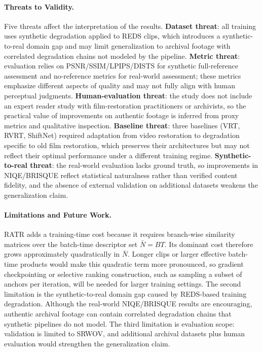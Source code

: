 \documentclass[symmetry,article,submit,pdftex,moreauthors]{Definitions/mdpi}
\begin{document}
\paragraph{Threats to Validity.}
Five threats affect the interpretation of the results. \textbf{Dataset threat}: all training uses synthetic degradation applied to REDS clips, which introduces a synthetic-to-real domain gap and may limit generalization to archival footage with correlated degradation chains not modeled by the pipeline. \textbf{Metric threat}: evaluation relies on PSNR/SSIM/LPIPS/DISTS for synthetic full-reference assessment and no-reference metrics for real-world assessment; these metrics emphasize different aspects of quality and may not fully align with human perceptual judgments. \textbf{Human-evaluation threat}: the study does not include an expert reader study with film-restoration practitioners or archivists, so the practical value of improvements on authentic footage is inferred from proxy metrics and qualitative inspection. \textbf{Baseline threat}: three baselines (VRT, RVRT, ShiftNet) required adaptation from video restoration to degradation specific to old film restoration, which preserves their architectures but may not reflect their optimal performance under a different training regime. \textbf{Synthetic-to-real threat}: the real-world evaluation lacks ground truth, so improvements in NIQE/BRISQUE reflect statistical naturalness rather than verified content fidelity, and the absence of external validation on additional datasets weakens the generalization claim.

\paragraph{Limitations and Future Work.}
RATR adds a training-time cost because it requires branch-wise similarity matrices over the batch-time descriptor set $\bar{N}=BT$. Its dominant cost therefore grows approximately quadratically in $\bar{N}$. Longer clips or larger effective batch-time products would make this quadratic term more pronounced, so gradient checkpointing or selective ranking construction, such as sampling a subset of anchors per iteration, will be needed for larger training settings. The second limitation is the synthetic-to-real domain gap caused by REDS-based training degradation. Although the real-world NIQE/BRISQUE results are encouraging, authentic archival footage can contain correlated degradation chains that synthetic pipelines do not model. The third limitation is evaluation scope: validation is limited to SRWOV, and additional archival datasets plus human evaluation would strengthen the generalization claim.
\end{document}
